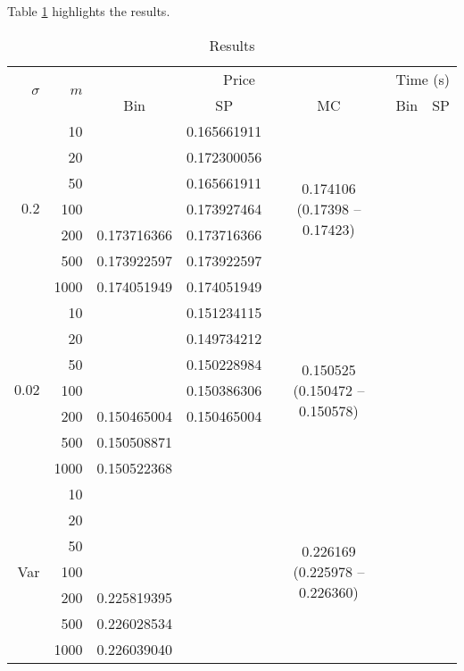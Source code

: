 Table \ref{tab:clq-results} highlights the results.
\begin{table}[h]
	\label{tab:clq-results}
	\centering
	\caption{Results}
	\begin{tabular}{rrccccc}
		\toprule
		\multirow{2}{1em}{$ \sigma $}  &  \multirow{2}{1em}{$ m $}
		&  \multicolumn{3}{c}{Price}  &  \multicolumn{2}{c}{Time (s)}  \\
		\cmidrule(lr){3-5}\cmidrule(lr){6-7}
		&&  Bin  &  SP  &  MC  &  Bin  &  SP  \\
		\midrule
		\multirow{7}{2em}{$ 0.2 $}
		&    10  &    &  0.165661911  &  \multirow{7}{5em}{0.174106 (0.17398 -- 0.17423)}  &    &    \\
		&    20  &    &  0.172300056  &    &    &    \\
		&    50  &    &  0.165661911  &    &    &    \\
		&   100  &    &  0.173927464  &    &    &    \\
		&   200  &  0.173716366  &  0.173716366  &    &    &    \\
		&   500  &  0.173922597  &  0.173922597  &    &    &    \\
		&  1000  &  0.174051949  &  0.174051949  &    &    &    \\
		\midrule
		\multirow{7}{2em}{$ 0.02 $}
		&    10  &    &  0.151234115  &  \multirow{7}{5em}{0.150525 (0.150472 -- 0.150578)}  &    &    \\
		&    20  &    &  0.149734212  &    &    &    \\
		&    50  &    &  0.150228984  &    &    &    \\
		&   100  &    &  0.150386306  &    &    &    \\
		&   200  &  0.150465004  &  0.150465004  &    &    &    \\
		&   500  &  0.150508871  &    &    &    &    \\
		&  1000  &  0.150522368  &    &    &    &    \\
		\midrule
		\multirow{7}{2em}{Var}
		&    10  &    &    &  \multirow{7}{5em}{0.226169 (0.225978 -- 0.226360)}  &    &    \\
		&    20  &    &    &    &    &    \\
		&    50  &    &    &    &    &    \\
		&   100  &    &    &    &    &    \\
		&   200  &  0.225819395  &    &    &    &    \\
		&   500  &  0.226028534  &    &    &    &    \\
		&  1000  &  0.226039040  &    &    &    &    \\
		\bottomrule
	\end{tabular}
\end{table}


